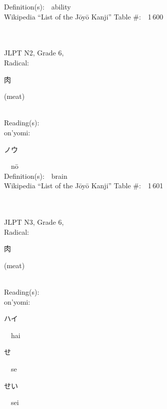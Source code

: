 \begin{multicols}{2}
Definition(s):\ \ ability \\
Wikipedia ``List of the J\=oy\=o Kanji'' Table \#:\ \ 1\,600 \\
\ \ \\
{\fontsize{34pt}{40pt}  }\ \ \\  %
{JLPT N2, Grade 6, \\Radical:\ \ {\begin{CJK}{UTF8}{min} 肉 \end{CJK}} (meat) } \\
Reading(s):\ \ \\
{\hspace*{1em}}on'yomi:\ \ \\
{\hspace*{2em}}{\begin{CJK}{UTF8}{min} ノウ \end{CJK}}\ \ n\=o\ \ \\
Definition(s):\ \ brain \\
Wikipedia ``List of the J\=oy\=o Kanji'' Table \#:\ \ 1\,601 \\
\ \ \\
{\fontsize{34pt}{40pt}  }\ \ \\  %
{JLPT N3, Grade 6, \\Radical:\ \ {\begin{CJK}{UTF8}{min} 肉 \end{CJK}} (meat) } \\
Reading(s):\ \ \\
{\hspace*{1em}}on'yomi:\ \ \\
{\hspace*{2em}}{\begin{CJK}{UTF8}{min} ハイ \end{CJK}}\ \ hai\ \ \\
{\hspace*{2em}}{\begin{CJK}{UTF8}{min} せ \end{CJK}}\ \ se\ \ \\
{\hspace*{2em}}{\begin{CJK}{UTF8}{min} せい \end{CJK}}\ \ sei\ \ \\

\end{multicols}
